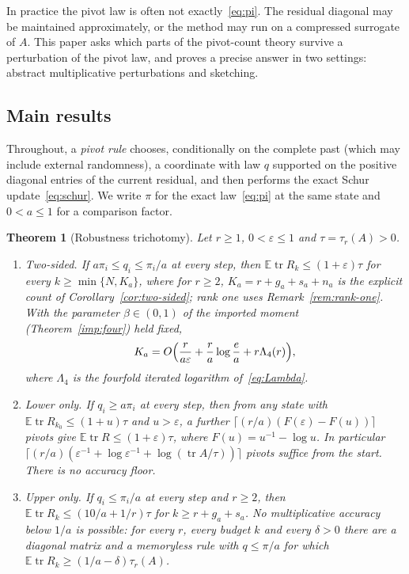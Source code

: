 \documentclass[11pt]{article}
\newtheorem{theorem}{Theorem}[section]
\theoremstyle{definition}\newtheorem{definition}[theorem]{Definition}
\theoremstyle{remark}\newtheorem{remark}[theorem]{Remark}
\newcommand{\E}{\mathbb E}
\newcommand{\eps}{\varepsilon}
\newcommand{\tr}{\operatorname{tr}}
\newcommand{\1}{\mathbf 1}
\begin{document}
In practice the pivot law is often not exactly~\eqref{eq:pi}. The
residual diagonal may be maintained approximately, or the method may run
on a compressed surrogate of $A$. This paper asks which parts of the
pivot-count theory survive a perturbation of the pivot law, and proves
a precise answer in two settings: abstract multiplicative perturbations
and sketching.

\subsection{Main results}
Throughout, a \emph{pivot rule} chooses, conditionally on the complete
past (which may include external randomness), a coordinate with law $q$
supported on the positive diagonal entries of the current residual, and
then performs the exact Schur update~\eqref{eq:schur}. We write $\pi$
for the exact law~\eqref{eq:pi} at the same state and $0<a\le1$ for a
comparison factor.

\begin{theorem}[Robustness trichotomy]\label{thm:intro-tri}
Let $r\ge1$, $0<\eps\le1$ and $\tau=\tau_r(A)>0$.
\begin{enumerate}[label=(\roman*)]
\item \emph{Two-sided.} If $a\pi_i\le q_i\le\pi_i/a$ at every step,
 then $\E\tr R_k\le(1+\eps)\tau$ for every $k\ge\min\{N,K_a\}$, where
 for $r\ge2$, $K_a=r+g_a+s_a+n_a$ is the explicit count of
 Corollary~\ref{cor:two-sided}; rank one uses
 Remark~\ref{rem:rank-one}. With the parameter $\beta\in(0,1)$ of the
 imported moment (Theorem~\ref{imp:four}) held fixed,
 \[
  K_a=O\Bigl(\frac r{a\eps}+\frac ra\log\frac ea+r\Lambda_4(r)\Bigr),
 \]
 where $\Lambda_4$ is the fourfold iterated logarithm of~\eqref{eq:Lambda}.
\item \emph{Lower only.} If $q_i\ge a\pi_i$ at every step, then from any
 state with $\E\tr R_{k_0}\le(1+u)\tau$ and $u>\eps$, a further
 $\lceil(r/a)(F(\eps)-F(u))\rceil$ pivots give $\E\tr R\le(1+\eps)\tau$,
 where $F(u)=u^{-1}-\log u$. In particular
 $\lceil(r/a)(\eps^{-1}+\log\eps^{-1}+\log(\tr A/\tau))\rceil$ pivots
 suffice from the start. There is no accuracy floor.
\item \emph{Upper only.} If $q_i\le\pi_i/a$ at every step and $r\ge2$,
 then $\E\tr R_k\le(10/a+1/r)\tau$ for $k\ge r+g_a+s_a$. No
 multiplicative accuracy below $1/a$ is possible: for every $r$, every
 budget $k$ and every $\delta>0$ there are a diagonal matrix and a
 memoryless rule with $q\le\pi/a$ for which
 $\E\tr R_k\ge(1/a-\delta)\tau_r(A)$.
\end{enumerate}
\end{theorem}
\end{document}
